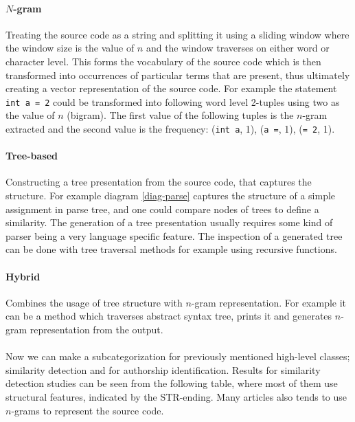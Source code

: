 \paragraph{$N$-gram}
Treating the source code as a string and splitting it using a sliding window where the window size is the value of $n$ and the window traverses on either word or character level. This forms the vocabulary of the source code which is then transformed into occurrences of particular terms that are present, thus ultimately creating a vector representation of the source code. For example the statement \texttt{int a = 2} could be transformed into following word level 2-tuples using two as the value of $n$ (bigram). The first value of the following tuples is the $n$-gram extracted and the second value is the frequency: (\texttt{int a}, 1), (\texttt{a =}, 1), (\texttt{= 2}, 1). 

\paragraph{Tree-based}
Constructing a tree presentation from the source code, that captures the structure. For example diagram \ref{diag-parse} captures the structure of a simple assignment in parse tree, and one could compare \eg nodes of trees to define a similarity. The generation of a tree presentation usually requires some kind of parser being a very language specific feature. The inspection of a generated tree can be done with tree traversal methods for example using recursive functions. 

\paragraph{Hybrid}
Combines the usage of tree structure with $n$-gram representation. For example it can be a method which traverses abstract syntax tree, prints it and generates $n$-gram representation from the output.
\\\\
Now we can make a subcategorization for previously mentioned high-level classes; similarity detection and for authorship identification. Results for similarity detection studies can be seen from the following table, where most of them use structural features, indicated by the STR-ending. Many articles also tends to use $n$-grams to represent the source code.

\pagebreak

